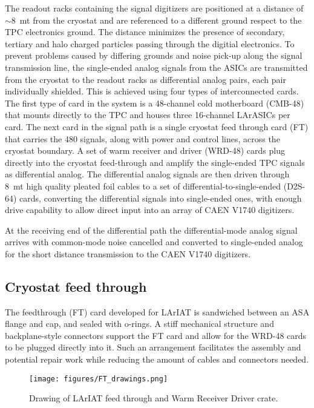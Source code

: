 The readout racks containing the signal digitizers are positioned at a distance of $\sim$8~mt from the cryostat and are referenced to a different ground respect to the TPC electronics ground.  The distance minimizes the presence of secondary, tertiary and halo charged particles passing through the digitial electronics.  To prevent problems caused by differing grounds and noise pick-up along the signal transmission line, the single-ended analog signals from the ASICs are transmitted from the cryostat to the readout racks as differential analog pairs, each pair individually shielded.  This is achieved using four types of interconnected cards.  The first type of card in the system is a 48-channel cold motherboard (CMB-48) that mounts directly to the TPC and houses three 16-channel LArASICs per card.  The next card in the signal path is a single cryostat feed through card (FT) that carries the 480 signals, along with power and control lines, across the cryostat boundary.  A set of warm receiver and driver (WRD-48) cards plug directly into the cryostat feed-through and amplify the single-ended TPC signals as differential analog. The differential analog signals are then driven through 8~mt high quality pleated foil cables to a set of differential-to-single-ended (D2S-64) cards, converting the differential signals into single-ended ones, with enough drive capability to allow direct input into an array of CAEN V1740 digitizers.

At the receiving end of the differential path the differential-mode analog signal arrives with common-mode noise cancelled and converted to single-ended analog for the short distance transmission to the CAEN V1740 digitizers.

\subsection*{Cryostat feed through}
The feedthrough (FT) card developed for LArIAT is sandwiched between an ASA flange and cap, and sealed with o-rings. A stiff mechanical structure and backplane-style connectors support the FT card and allow for the WRD-48 cards to be plugged directly into it. Such an arrangement facilitates the assembly and potential repair work while reducing the amount of cables and connectors needed.

\begin{figure}[htbp]
 \centering
 \texttt{[image: figures/FT\_drawings.png]}
\caption{
Drawing of LArIAT feed through and Warm Receiver Driver crate. 
} 
\label{pic:FeedthroughElectronics}
\end{figure}

